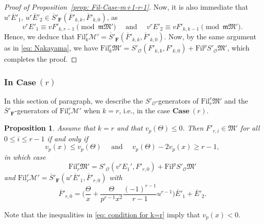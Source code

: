 \documentclass[11pt]{amsart}
\theoremstyle{definition}
\numberwithin{equation}{subsection}
\theoremstyle{plain}
\theoremstyle{plain}
\theoremstyle{plain}
\theoremstyle{plain}
\theoremstyle{plain}
\theoremstyle{plain}
\theoremstyle{plain}
\theoremstyle{plain}
\newtheorem{prop}[equation]{Proposition}
\theoremstyle{plain}
\theoremstyle{plain}
\theoremstyle{plain}
\theoremstyle{plain}
\theoremstyle{definition}
\theoremstyle{definition}
\theoremstyle{definition}
\theoremstyle{remark}
\renewcommand{\(}{\textup{(}}
\renewcommand{\)}{\textup{)}}
\newcommand{\F}{\mathbf{F}}
\newcommand{\barS}{\overline{S}}
\newcommand{\cM}{\mathcal{M}}
\newcommand{\fM}{\mathfrak{M}}
\newcommand{\fm}{\mathfrak{m}}
\newcommand{\Fil}{\mathrm{Fil}}
\newcommand{\cO}{\mathcal{O}}
\newcommand{\barE}{\overline{E}}
\newcommand{\barF}{\overline{F}}
\begin{document}
\begin{proof}[Proof of Proposition~\ref{prop: Fil-Case-m+1-r-1}]
Now, it is also immediate that $u^r\barE'_1,\,u^r\barE'_2\in \barS'_\F(\barF'_{k,k},\barF'_{k,0})$, as $$v^rE'_1\equiv vF'_{k,r-1}\pmod{\fm\fM'}\quad\mbox{ and }\quad v^rE'_2\equiv vF'_{k,k-1}\pmod{\fm\fM'}.$$ Hence, we deduce that $\Fil^r_{k}\cM'=\barS'_\F(\barF'_{k,k},\barF'_{k,0})$. Now, by the same argument as in \eqref{eq: Nakayama}, we have
$\Fil^r_{k}\fM' =S'_\cO(F'_{k,k},F'_{k,0})+\Fil^pS'_\cO\fM'$, which completes the proof.
\end{proof}


\subsubsection{\textbf{In $\mathbf{Case}~(r)$}}
In this section of paragraph, we describe the $S'_\cO$-generators of $\Fil^r_{r}\fM'$ and the $\barS'_\F$-generators of $\Fil^r_{r}\cM'$ when $k=r$, i.e., in the case $\mathbf{Case}~(r)$.


\begin{prop}\label{prop: Fil-Case-r}
Assume that $k=r$ and that $v_p(\Theta)\leq 0$. Then $F'_{r,i}\in \fM'$ for all $0\leq i\leq r-1$ if and only if
\begin{equation}\label{eq: condition for k=r}
v_p(x)\leq v_p(\Theta) \quad\mbox{ and }\quad v_p(\Theta)-2v_p(x)\geq r-1,
\end{equation}
in which case
$$\Fil^r_{r}\fM'=S'_\cO (v^rE_1',F'_{r,0})+\Fil^pS'_\cO\fM'$$
and $\Fil^r_{r}\cM'=\barS'_\F(u^r\barE'_1,\barF'_{r,0})$ with
$$\barF'_{r,0}=\bigg(\frac{\Theta}{x}+\frac{\Theta}{p^{r-1}x^2}\frac{(-1)^{r-1}}{r-1}u^{r-1}\bigg)\barE'_1+\barE'_2.$$
\end{prop}

Note that the inequalities in \eqref{eq: condition for k=r} imply that $v_p(x)<0$.
\end{document}
